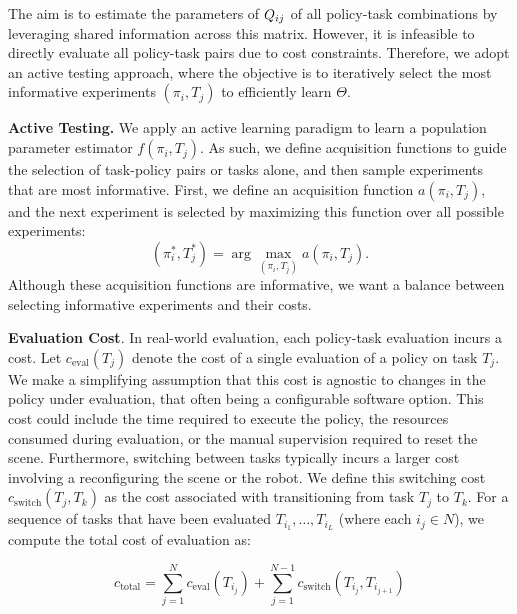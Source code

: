 The aim is to estimate the parameters of $Q_{ij}$ of all policy-task combinations by leveraging shared information across this matrix.
However, it is infeasible to directly evaluate all policy-task pairs due to cost constraints. 
Therefore, we adopt an active testing approach, where the objective is to iteratively select the most informative experiments $(\pi_i, T_j)$ to efficiently learn $\Theta$. 

\textbf{Active Testing.}
We apply an active learning paradigm to learn a population parameter estimator $f(\pi_i, T_j)$.
As such, we define acquisition functions to guide the selection of task-policy pairs or tasks alone, and then sample experiments that are most informative.
First, we define an acquisition function $a(\pi_i, T_j)$, and the next experiment is selected by maximizing this function over all possible experiments:
\begin{equation}
    (\pi_i^*, T_j^*) = \arg\max_{(\pi_i, T_j)} a(\pi_i, T_j).
\end{equation}
Although these acquisition functions are informative, we want a balance between selecting informative experiments and their costs.

\textbf{Evaluation Cost}. In real-world evaluation, each policy-task evaluation incurs a cost. 
Let $c_{\text{eval}}(T_j)$ denote the cost of a single evaluation of a policy on task $T_j$.
We make a simplifying assumption that this cost is agnostic to changes in the policy under evaluation, that often being a configurable software option.
This cost could include the time required to execute the policy, the resources consumed during evaluation, or the manual supervision required to reset the scene.
Furthermore, switching between tasks typically incurs a larger cost involving a reconfiguring the scene or the robot. 
We define this switching cost $c_{\text{switch}}(T_j, T_k)$ as the cost associated with transitioning from task $T_j$ to $T_k$.
For a sequence of tasks that have been evaluated $T_{i_1}, \ldots, T_{i_L}$ (where each $i_j \in N$), we compute the total cost of evaluation as:

$$c_{\text{total}} = \sum_{j=1}^N c_{\text{eval}}(T_{i_j}) + \sum_{j=1}^{N-1} c_{\text{switch}}(T_{i_j}, T_{i_{j+1}})$$

